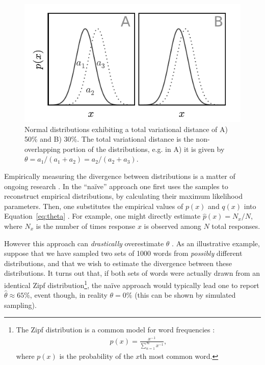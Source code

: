 \documentclass{sigchi}
\begin{document}
\begin{figure}
	\centering
	\includegraphics[scale=1.0]{figs/normal_example.pdf}
	\caption{
	  	Normal distributions exhibiting a total variational distance
		of A) 50\% and B) 30\%.  The total variational distance is 
		the non-overlapping portion of the distributions, e.g. in
		A) it is given by 
		$\theta = a_1 / (a_1 + a_2) = a_2 / (a_2 + a_3)$.
	}
	\label{fig:l1_example}
\end{figure}

Empirically measuring the divergence between distributions
is a matter of ongoing
research \cite{val-thesis,batu2013testing,chan2014optimal}.
In the ``na\"ive'' approach one first uses the samples to reconstruct 
empirical
distributions, by calculating their maximum likelihood parameters.
Then, one substitutes the empirical values of $p(x)$ and $q(x)$ into 
Equation~\ref{eq:theta} \cite{batu2013testing}.  
For example, one might directly estimate $\hat{p}(x) = N_x/N$, 
where $N_x$ is the number of times response $x$ is observed among $N$ 
total responses.

However this approach can \textit{drastically} overestimate $\theta$
\cite{val-thesis}.  As an illustrative example,
suppose that we have sampled two sets of 1000 words from \textit{possibly} 
different distributions, and that we wish to estimate the divergence 
between these distributions.  
It turns out that, if both sets of words were actually drawn from 
an identical Zipf distribution\footnote{The 
  Zipf distribution is a common model for word frequencies 
  \cite{powers1998applications,zipf1949human}:
  \begin{align}
	p(x) = \frac{x^{-1}}{\sum_{n=1}^{\infty}x^{-1}},
	\label{eq:zipf}
  \end{align}
  where $p(x)$ is the probability of the $x$th most common word.
}, the na\"ive approach would typically lead one to report 
$\hat{\theta} \approx 65\%$, event though, in reality $\theta = 0\%$
(this can be shown by simulated sampling).
\end{document}
